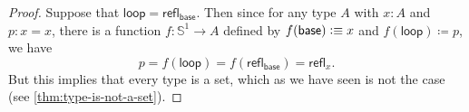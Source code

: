 \documentclass[10pt,a4paper]{article}
\newcommand{\defeq}{\vcentcolon\equiv}  %
\newcommand{\defid}{\coloneqq}
\newcommand{\refl}[1]{\ensuremath{\mathsf{refl}_{#1}}\xspace}
\newcommand{\map}[2]{\ensuremath{{#1}\mathopen{}\left({#2}\right)\mathclose{}}\xspace}
\let\ap\map
\newcommand{\Sn}{\mathbb{S}}
\newcommand{\base}{\ensuremath{\mathsf{base}}\xspace}
\newcommand{\lloop}{\ensuremath{\mathsf{loop}}\xspace}
\theoremstyle{definition}
\theoremstyle{remark}
\numberwithin{equation}{section}
\begin{document}
\begin{proof}
  Suppose that $\lloop=\refl{\base}$.
  Then since for any type $A$ with $x:A$ and $p:x=x$, there is a function $f:\Sn^1\to A$ defined by $f(\base)\defeq x$ and $\ap f \lloop \defid p$, we have
  \[p = f(\lloop) = f(\refl{\base}) = \refl{x}.\]
  But this implies that every type is a set, which as we have seen is not the case (see \cref{thm:type-is-not-a-set}).
\end{proof}
\end{document}
